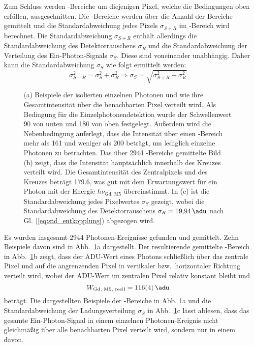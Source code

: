 \noindent
Zum Schluss werden -Bereiche um diejenigen Pixel, welche die Bedingungen oben erfüllen, ausgeschnitten. Die -Bereiche werden über die Anzahl der Bereiche gemittelt und die Standardabweichung jedes Pixels $\sigma_{S+R}$ im -Bereich wird berechnet. Die Standardabweichung $\sigma_{S+R}$ enthält allerdings die Standardabweichung des Detektorrauschens $\sigma_{R}$ und die Standardabweichung der Verteilung des Ein-Photon-Signals $\sigma_{S}$. Diese sind voneinander unabhängig. Daher kann die Standardabweichung $\sigma_{S}$ wie folgt ermittelt werden:
\begin{equation}
    \sigma_{S+R}^2 = \sigma_{S}^2 + \sigma_{R}^2 \Rightarrow \sigma_{S} = \sqrt{\sigma_{S+R}^2 - \sigma_{R}^2}
    \label{eq:std_entkopplung}
\end{equation}
\begin{figure}[H]
    \centering
    
    \caption{(a) Beispiele der isolierten einzelnen Photonen und wie ihre Gesamtintensität über die benachbarten Pixel verteilt wird. Als Bedingung für die Einzelphotonendetektion wurde der Schwellenwert \SI{90}{\adu} von unten und \SI{180}{\adu} von oben festgelegt. Außerdem wird die Nebenbedingung auferlegt, dass die Intensität über einen -Bereich mehr als \SI{161}{\adu} und weniger als \SI{200}{\adu} beträgt, um lediglich einzelne Photonen zu betrachten. Das über 2944 -Bereiche gemittelte Bild (b) zeigt, dass die Intensität hauptsächlich innerhalb des Kreuzes verteilt wird. Die Gesamtintensität des Zentralpixels und des Kreuzes beträgt \SI{179.6}{\adu}, was gut mit dem Erwartungswert für ein Photon mit der Energie $h\nu_\text{Gd, M5}$ übereinstimmt. In (c) ist die Standardabweichung jedes Pixelwertes $\sigma_{S}$ gezeigt, wobei die Standardabweichung des Detektorrauschens $\sigma_R = \SI{19.94}{\adu}$ nach Gl. (\ref{eq:std_entkopplung}) abgezogen wird.}
    \label{fig:examples_average_std_5x5_hotspot}
\end{figure}
\noindent
Es wurden insgesamt 2944 Photonen-Ereignisse gefunden und gemittelt. Zehn Beispiele davon sind in Abb.~\ref{fig:examples_average_std_5x5_hotspot}a dargestellt. Der resultierende gemittelte -Bereich in Abb.~\ref{fig:examples_average_std_5x5_hotspot}b zeigt, dass der ADU-Wert eines Photons schließlich über das zentrale Pixel und auf die angrenzenden Pixel in vertikaler bzw.\ horizontaler Richtung verteilt wird, wobei der ADU-Wert im zentralen Pixel relativ konstant bleibt und 
\begin{equation}
    W_\text{Gd, M5, reell}  = \SI{116(4)}{\adu} 
\end{equation}
beträgt. Die dargestellten Beispiele der -Bereiche in Abb. \ref{fig:examples_average_std_5x5_hotspot}a und die Standardabweichung der Ladungsverteilung $\sigma_{S}$ in Abb.~\ref{fig:examples_average_std_5x5_hotspot}c lässt ablesen, dass das gesamte Ein-Photon-Signal in einem einzelnen Photonen-Ereignis nicht gleichmäßig über alle benachbarten Pixel verteilt wird, sondern nur in einem davon. 

